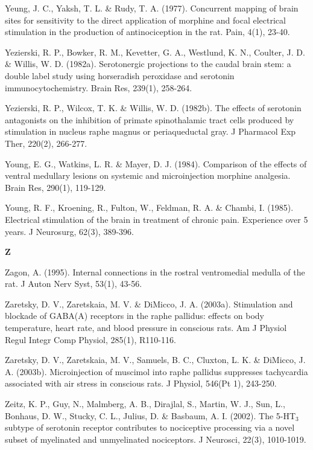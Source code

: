 \documentclass[a4paper,12pt,twoside]{report}
\begin{document}
\begin{singlespacing}
\begin{footnotesize}
Yeung, J. C., Yaksh, T. L. \& Rudy, T. A. (1977). Concurrent mapping of brain sites for sensitivity to the direct application of morphine and focal electrical stimulation in the production of antinociception in the rat. Pain, 4(1), 23-40.

Yezierski, R. P., Bowker, R. M., Kevetter, G. A., Westlund, K. N., Coulter, J. D. \& Willis, W. D. (1982a). Serotonergic projections to the caudal brain stem: a double label study using horseradish peroxidase and serotonin immunocytochemistry. Brain Res, 239(1), 258-264.

Yezierski, R. P., Wilcox, T. K. \& Willis, W. D. (1982b). The effects of serotonin antagonists on the inhibition of primate spinothalamic tract cells produced by stimulation in nucleus raphe magnus or periaqueductal gray. J Pharmacol Exp Ther, 220(2), 266-277.

Young, E. G., Watkins, L. R. \& Mayer, D. J. (1984). Comparison of the effects of ventral medullary lesions on systemic and microinjection morphine analgesia. Brain Res, 290(1), 119-129.

Young, R. F., Kroening, R., Fulton, W., Feldman, R. A. \& Chambi, I. (1985). Electrical stimulation of the brain in treatment of chronic pain. Experience over 5 years. J Neurosurg, 62(3), 389-396.

\medskip
\begin{Large}\textbf{Z}\end{Large}

Zagon, A. (1995). Internal connections in the rostral ventromedial medulla of the rat. J Auton Nerv Syst, 53(1), 43-56.

Zaretsky, D. V., Zaretskaia, M. V. \& DiMicco, J. A. (2003a). Stimulation and blockade of GABA(A) receptors in the raphe pallidus: effects on body temperature, heart rate, and blood pressure in conscious rats. Am J Physiol Regul Integr Comp Physiol, 285(1), R110-116.

Zaretsky, D. V., Zaretskaia, M. V., Samuels, B. C., Cluxton, L. K. \& DiMicco, J. A. (2003b). Microinjection of muscimol into raphe pallidus suppresses tachycardia associated with air stress in conscious rats. J Physiol, 546(Pt 1), 243-250.

Zeitz, K. P., Guy, N., Malmberg, A. B., Dirajlal, S., Martin, W. J., Sun, L., Bonhaus, D. W., Stucky, C. L., Julius, D. \& Basbaum, A. I. (2002). The 5-HT$_{3}$ subtype of serotonin receptor contributes to nociceptive processing via a novel subset of myelinated and unmyelinated nociceptors. J Neurosci, 22(3), 1010-1019.


\end{footnotesize}
\end{singlespacing}
\end{document}
